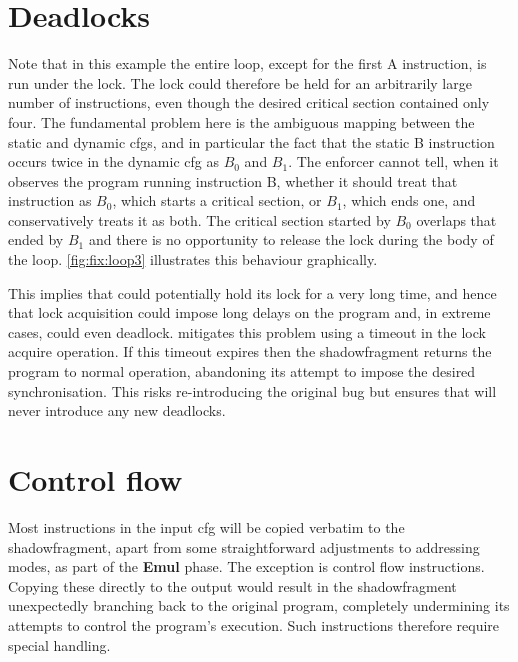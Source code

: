 \section{Deadlocks}
\label{sect:fix:deadlocks}
Note that in this example the entire loop, except for the first A
instruction, is run under the lock.  The lock could therefore be held
for an arbitrarily large number of instructions, even though the
desired critical section contained only four.  The fundamental problem
here is the ambiguous mapping between the static and dynamic
\glspl{cfg}, and in particular the fact that the static B instruction
occurs twice in the \gls{dynamic cfg} as $B_0$ and $B_1$.  The
enforcer cannot tell, when it observes the program running instruction
B, whether it should treat that instruction as $B_0$, which starts a
critical section, or $B_1$, which ends one, and conservatively treats
it as both.  The critical section started by $B_0$ overlaps that ended
by $B_1$ and there is no opportunity to release the lock during the
body of the loop.  \autoref{fig:fix:loop3} illustrates this behaviour
graphically.

This implies that {\technique} could potentially hold its lock for a
very long time, and hence that lock acquisition could impose long
delays on the program and, in extreme cases, could even deadlock.
{\Technique} mitigates this problem using a timeout in the lock
acquire operation.  If this timeout expires then the
\gls{shadowfragment} returns the program to normal operation,
abandoning its attempt to impose the desired
synchronisation.\kern-1.25pt  This risks re-introducing the original bug
but ensures that {\technique} will never introduce any new deadlocks.

\section{Control flow}
\label{sect:fix:control_flow}
Most instructions in the input \gls{cfg} will be copied verbatim to
the \gls{shadowfragment}, apart from some straightforward adjustments
to addressing modes, as part of the \textbf{Emul} phase.  The
exception is control flow instructions.  Copying these directly to the
output would result in the \gls{shadowfragment} unexpectedly branching
back to the original program, completely undermining its attempts to
control the program's execution.  Such instructions therefore require
special handling.

